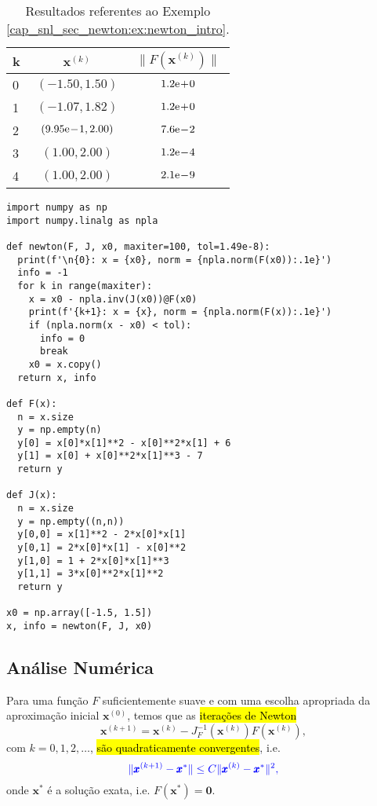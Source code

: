 \begin{ex}
  \begin{table}[H]
    \centering
    \caption{Resultados referentes ao Exemplo \ref{cap_snl_sec_newton:ex:newton_intro}.}
    \begin{tabular}{lcc}
      k & $\pmb{x}^{(k)}$ & $\|F(\pmb{x}^{(k)})\|$\\\hline
      0 & $(-1.50, 1.50)$ & $1.2\mathrm{e}\!+\!0$\\
      1 & $(-1.07, 1.82)$ & $1.2\mathrm{e}\!+\!0$\\
      2 & $(9.95\mathrm{e}\!-\!1, 2.00)$ & $7.6\mathrm{e}\!-\!2$\\
      3 & $(1.00, 2.00)$ & $1.2\mathrm{e}\!-\!4$ \\
      4 & $(1.00, 2.00)$ & $2.1\mathrm{e}\!-\!9$ \\\hline
    \end{tabular}
    \label{cap_snl_sec_newton:tab:newton_intro}
  \end{table}

\begin{lstlisting}
import numpy as np
import numpy.linalg as npla

def newton(F, J, x0, maxiter=100, tol=1.49e-8):
  print(f'\n{0}: x = {x0}, norm = {npla.norm(F(x0)):.1e}')
  info = -1
  for k in range(maxiter):
    x = x0 - npla.inv(J(x0))@F(x0)
    print(f'{k+1}: x = {x}, norm = {npla.norm(F(x)):.1e}')
    if (npla.norm(x - x0) < tol):
      info = 0
      break
    x0 = x.copy()
  return x, info

def F(x):
  n = x.size
  y = np.empty(n)
  y[0] = x[0]*x[1]**2 - x[0]**2*x[1] + 6
  y[1] = x[0] + x[0]**2*x[1]**3 - 7
  return y

def J(x):
  n = x.size
  y = np.empty((n,n))
  y[0,0] = x[1]**2 - 2*x[0]*x[1]
  y[0,1] = 2*x[0]*x[1] - x[0]**2
  y[1,0] = 1 + 2*x[0]*x[1]**3
  y[1,1] = 3*x[0]**2*x[1]**2
  return y

x0 = np.array([-1.5, 1.5])
x, info = newton(F, J, x0)
\end{lstlisting}

\end{ex}

\subsection{Análise Numérica}

Para uma função $F$ suficientemente suave e com uma escolha apropriada da aproximação inicial $\pmb{x}^{(0)}$, temos que as \hl{iterações de Newton}
\begin{equation}
  \pmb{x}^{(k+1)} = \pmb{x}^{(k)} - J_F^{-1}(\pmb{x}^{(k)})F(\pmb{x}^{(k)}),
\end{equation}
com $k=0, 1, 2, \ldots$, \hl{são quadraticamente convergentes}, i.e.
\begin{equation}\color{blue}\|\pmb{x}^{(k+1)} - \pmb{x}^*\| \leq C\|\pmb{x}^{(k)}-\pmb{x}^*\|^2,
\end{equation}
onde $\pmb{x}^*$ é a solução exata, i.e. $F(\pmb{x}^*) = \pmb{0}$.

